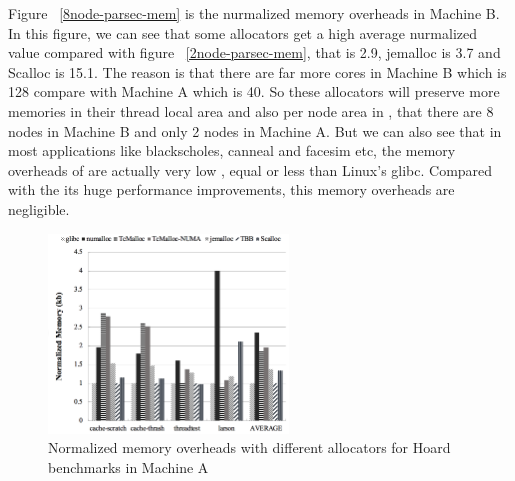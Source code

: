 Figure ~\ref{8node-parsec-mem} is the nurmalized memory overheads in Machine B. In this figure, we can see that some allocators get a high average nurmalized value compared with figure ~\ref{2node-parsec-mem}, that \NM{} is 2.9, jemalloc is 3.7 and Scalloc is 15.1. The reason is that there are far more cores in Machine B which is 128 compare with Machine A which is 40. So these allocators will preserve more memories in their thread local area and also per node area in \NM{}, that there are 8 nodes in Machine B and only 2 nodes in Machine A. But we can also see that in most applications like blackscholes, canneal and facesim etc, the memory overheads of \NM{} are actually very low , equal or less than Linux's glibc. Compared with the its huge performance improvements, this memory overheads are negligible.

\begin{figure}[H]
    \centering
    \includegraphics[width=\textwidth,height=200]{figure/2-node-hoard-mem.png}
    \caption{Normalized memory overheads with different allocators for Hoard benchmarks in Machine A}
    \label{2node-hoard-mem}
\end{figure}

